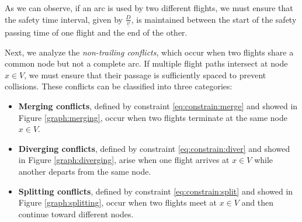 \documentclass[../../thesis.tex]{subfiles}
\begin{document}
As we can observe, if an arc is used by two different flights, we must ensure that the safety time interval, given by \( \frac{D}{\underline v} \), is maintained between the start of the safety passing time of one flight and the end of the other.

Next, we analyze the \textit{non-trailing conflicts}, which occur when two flights share a common node but not a complete arc.  
If multiple flight paths intersect at node \(x\in V\), we must ensure that their passage is sufficiently spaced to prevent collisions.  
These conflicts can be classified into three categories:  

\begin{itemize}
    \item \textbf{Merging conflicts}, defined by constraint \eqref{eq:constrain:merge} and showed in Figure \ref{graph:merging}, occur when two flights terminate at the same node \(x\in V\).
    \item \textbf{Diverging conflicts}, defined by constraint \eqref{eq:constrain:diver} and showed in Figure \ref{graph:diverging}, arise when one flight arrives at \(x\in V\) while another departs from the same node.
    \item \textbf{Splitting conflicts}, defined by constraint \eqref{eq:constrain:split} and showed in Figure \ref{graph:splitting}, occur when two flights meet at \(x\in V\) and then continue toward different nodes.
\end{itemize}
\end{document}
